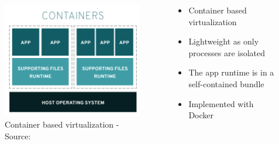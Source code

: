 \documentclass{beamer}
\begin{document}
\begin{frame}{}
  \begin{columns}[totalwidth=\textwidth]
    \begin{column}{0.5\textwidth}
      \begin{figure}
        \includegraphics[width=1.1\textwidth]{img/docker-vm-redhat.png}
        \caption{\footnotesize Container based virtualization - \textcolor{uos-grey-full}{Source: {\cite{redhat_pic}}}}
      \end{figure}
    \end{column}
    \begin{column}{0.4\textwidth}
      \begin{itemize}
    \setlength\itemsep{0.6em}
        \item Container based virtualization
        \item Lightweight as only processes are isolated
        \item The app runtime is in a self-contained bundle
        \item Implemented with Docker
      \end{itemize}
    \end{column}
  \end{columns}
\end{frame}
\end{document}
